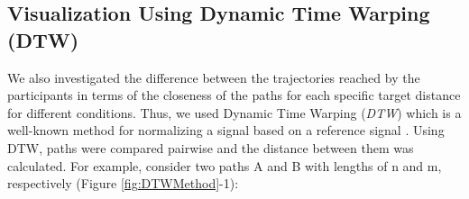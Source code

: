 
\subsection{Visualization Using Dynamic Time Warping (DTW)} \label{DTW}
We also investigated the difference between the trajectories reached by the participants in terms of the closeness of the paths for each specific target distance for different conditions. Thus, we used Dynamic Time Warping (\textit{DTW}) which is a well-known method for normalizing a signal based on a reference signal \cite{kr05,bw95}. Using DTW, paths were compared pairwise and the distance between them was calculated. For example, consider two paths A and B with lengths of n and m, respectively (Figure \ref{fig:DTWMethod}-1):

